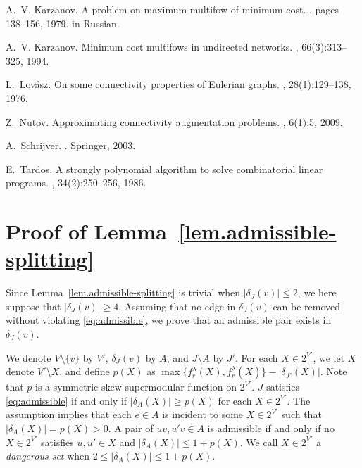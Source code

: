 \documentclass{article}
\newcommand{\g}{f^{\lambda}}
\begin{document}
\begin{thebibliography}{10}
A.~V. Karzanov.
\newblock A problem on maximum multifow of minimum cost.
, pages 138--156, 1979.
\newblock in Russian.

A.~V. Karzanov.
\newblock Minimum cost multifows in undirected networks.
, 66(3):313--325, 1994.

L.~Lov\'asz.
\newblock On some connectivity properties of {E}ulerian graphs.
, 28(1):129--138, 1976.

Z.~Nutov.
\newblock Approximating connectivity augmentation problems.
, 6(1):5, 2009.

A.~Schrijver.
.
\newblock Springer, 2003.

E.~Tardos.
\newblock A strongly polynomial algorithm to solve combinatorial linear
  programs.
, 34(2):250--256, 1986.

\end{thebibliography}

\appendix

\section{Proof of Lemma~\ref{lem.admissible-splitting}}
\label{sec:splitting}
Since Lemma~\ref{lem.admissible-splitting} is trivial when $|\delta_J(v)| \leq 2$,
we here suppose that $|\delta_J(v)| \geq 4$.
Assuming that no edge in $\delta_J(v)$ can be removed without violating \eqref{eq:admissible},
we prove that an admissible pair exists in $\delta_J(v)$.

We denote 
$V\setminus \{v\}$ by $V'$,
$\delta_J(v)$ by $A$,
and $J \setminus A$ by $J'$.
For each $X \in 2^{V'}$,
we let $\bar{X}$ denote $V' \setminus X$,
and define $p(X)$ as 
$\max\{\g_r(X),\g_r(\bar{X})\} - |\delta_{J'}(X)|$.
Note that $p$ is a symmetric skew supermodular function on $2^{V'}$.
$J$ satisfies \eqref{eq:admissible} if and only if
$|\delta_A(X)| \geq p(X)$ for each $X \in 2^{V'}$.
The assumption implies that
each $e \in A$ is incident to some $X \in 2^{V'}$
such that $|\delta_A(X)| = p(X)>0$.
A pair of $uv,u'v \in A$ is admissible if and only if no $X \in 2^{V'}$ satisfies
$u,u' \in X$ and $|\delta_A(X)|\leq 1+p(X)$.
We call $X \in 2^{V'}$ a \emph{dangerous set} when
$2 \leq |\delta_A(X)| \leq 1+p(X)$.
\end{document}
